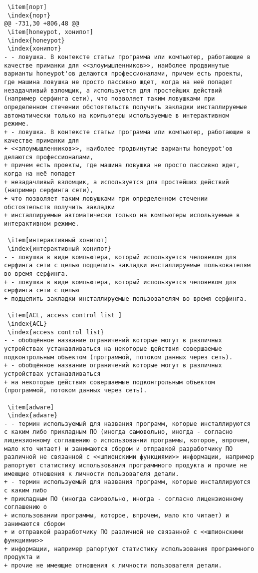\begin{verbatim}
 \item[порт]
 \index{порт}
@@ -731,30 +806,48 @@
 \item[honeypot, хонипот]
 \index{honeypot}
 \index{хонипот}
- - ловушка. В контексте статьи программа или компьютер, работающие в качестве приманки для <<злоумышленников>>, наиболее продвинутые варианты honeypot'ов делаются профессионалами, причем есть проекты, где машина ловушка не просто пассивно ждет, когда на неё попадет незадачливый взломщик, а используется для простейших действий (например серфинга сети), что позволяет таким ловушками при определенном стечении обстоятельств получить закладки инсталлируемые автоматически только на компьютеры используемые в интерактивном режиме.
+ - ловушка. В контексте статьи программа или компьютер, работающие в качестве приманки для
+ <<злоумышленников>>, наиболее продвинутые варианты honeypot'ов делаются профессионалами,
+ причем есть проекты, где машина ловушка не просто пассивно ждет, когда на неё попадет
+ незадачливый взломщик, а используется для простейших действий (например серфинга сети),
+ что позволяет таким ловушками при определенном стечении обстоятельств получить закладки
+ инсталлируемые автоматически только на компьютеры используемые в интерактивном режиме.

 \item[интерактивный хонипот]
 \index{интерактивный хонипот}
- - ловушка в виде компьютера, который используется человеком для серфинга сети с целью подцепить закладки инсталлируемые пользователям во время серфинга.
+ - ловушка в виде компьютера, который используется человеком для серфинга сети с целью
+ подцепить закладки инсталлируемые пользователям во время серфинга.

 \item[ACL, access control list ]
 \index{ACL}
 \index{access control list}
- - обобщённое название ограничений которые могут в различных устройствах устанавливаться на некоторые действия совершаемые подконтрольным объектом (программой, потоком данных через сеть).
+ - обобщённое название ограничений которые могут в различных устройствах устанавливаться
+ на некоторые действия совершаемые подконтрольным объектом (программой, потоком данных через сеть).

 \item[adware]
 \index{adware}
- - термин используемый для названия программ, которые инсталлируются с каким либо прикладным ПО (иногда самовольно, иногда - согласно лицензионному соглашению о использовании программы, которое, впрочем, мало кто читает) и занимаются сбором и отправкой разработчику ПО различной не связанной с <<шпионскими функциями>> информации, например рапортуют статистику использования программного продукта и прочие не имеющие отношения к личности пользователя детали.
+ - термин используемый для названия программ, которые инсталлируются с каким либо
+ прикладным ПО (иногда самовольно, иногда - согласно лицензионному соглашению о
+ использовании программы, которое, впрочем, мало кто читает) и занимаются сбором
+ и отправкой разработчику ПО различной не связанной с <<шпионскими функциями>>
+ информации, например рапортуют статистику использования программного продукта и
+ прочие не имеющие отношения к личности пользователя детали.


\end{verbatim}
